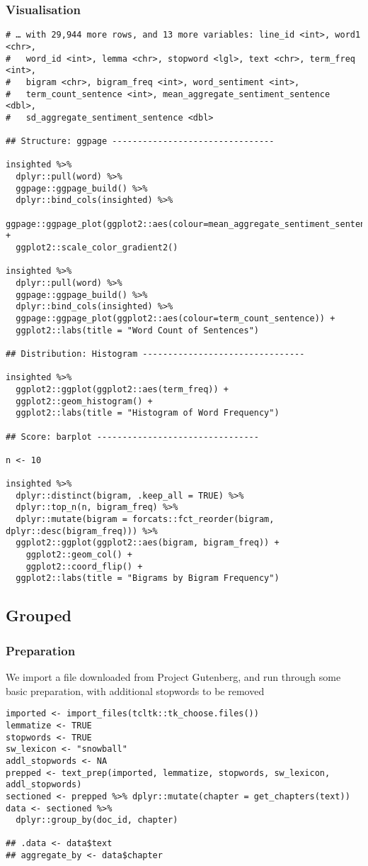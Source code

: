 \documentclass[a4paper, 11pt]{article}
\begin{document}
\subsubsection{Visualisation}
\label{sec:orgaaa01b6}
\begin{verbatim}
# … with 29,944 more rows, and 13 more variables: line_id <int>, word1 <chr>,
#   word_id <int>, lemma <chr>, stopword <lgl>, text <chr>, term_freq <int>,
#   bigram <chr>, bigram_freq <int>, word_sentiment <int>,
#   term_count_sentence <int>, mean_aggregate_sentiment_sentence <dbl>,
#   sd_aggregate_sentiment_sentence <dbl>

## Structure: ggpage --------------------------------

insighted %>%
  dplyr::pull(word) %>%
  ggpage::ggpage_build() %>%
  dplyr::bind_cols(insighted) %>%
  ggpage::ggpage_plot(ggplot2::aes(colour=mean_aggregate_sentiment_sentence)) +
  ggplot2::scale_color_gradient2()

insighted %>%
  dplyr::pull(word) %>%
  ggpage::ggpage_build() %>%
  dplyr::bind_cols(insighted) %>%
  ggpage::ggpage_plot(ggplot2::aes(colour=term_count_sentence)) +
  ggplot2::labs(title = "Word Count of Sentences")

## Distribution: Histogram --------------------------------

insighted %>%
  ggplot2::ggplot(ggplot2::aes(term_freq)) +
  ggplot2::geom_histogram() +
  ggplot2::labs(title = "Histogram of Word Frequency")

## Score: barplot --------------------------------

n <- 10

insighted %>%
  dplyr::distinct(bigram, .keep_all = TRUE) %>%
  dplyr::top_n(n, bigram_freq) %>%
  dplyr::mutate(bigram = forcats::fct_reorder(bigram, dplyr::desc(bigram_freq))) %>%
  ggplot2::ggplot(ggplot2::aes(bigram, bigram_freq)) +
    ggplot2::geom_col() +
    ggplot2::coord_flip() +
  ggplot2::labs(title = "Bigrams by Bigram Frequency")
\end{verbatim}
\subsection{Grouped}
\label{sec:orgb14037b}
\subsubsection{Preparation}
\label{sec:org9c8b448}
We import a file downloaded from Project Gutenberg, and run through
some basic preparation, with additional stopwords to be removed
\begin{verbatim}
imported <- import_files(tcltk::tk_choose.files())
lemmatize <- TRUE
stopwords <- TRUE
sw_lexicon <- "snowball"
addl_stopwords <- NA
prepped <- text_prep(imported, lemmatize, stopwords, sw_lexicon, addl_stopwords)
sectioned <- prepped %>% dplyr::mutate(chapter = get_chapters(text))
data <- sectioned %>%
  dplyr::group_by(doc_id, chapter)

## .data <- data$text
## aggregate_by <- data$chapter
\end{verbatim}
\end{document}

